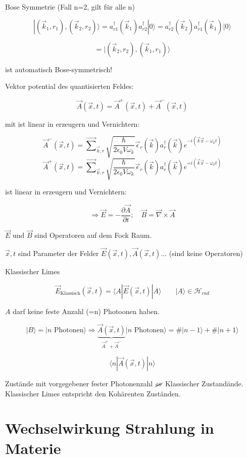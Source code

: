 Bose Symmetrie (Fall n=2, gilt für alle n)


\[|(\vec k_1,r_1),(\vec k_2,r_2)\rangle = a^\dagger_{r1}(\vec k_1) a^\dagger_{r2} |0\rangle =  a^\dagger_{r2}(\vec k_2) a^\dagger_{r1}(\vec k_1) |0\rangle   \]

\[= |(\vec k_2,r_2),(\vec k_1,r_1)\rangle    \]

ist automatisch Bose-symmetrisch!


Vektor potential des quantisierten Feldes:

\[\vec A(\vec x,t) = \vec A^+(\vec x,t) +\vec A^-(\vec x,t)  \]


mit ist linear in erzeugern und Vernichtern:

\[\vec A^-(\vec x,t) =\vec \sum_{\vec k,r} \sqrt{\frac{\hbar}{2\epsilon_0 V\omega_k}}\vec \epsilon_r(\vec k)a^\dagger_r(\vec k)e^{-i(\vec k\vec x-\omega_k t)}\]
\[\vec A^+(\vec x,t) =\vec \sum_{\vec k,r} \sqrt{\frac{\hbar}{2\epsilon_0 V\omega_k}}\vec \epsilon_r(\vec k)a^\dagger_r(\vec k)e^{+i(\vec k\vec x-\omega_k t)}\]

ist linear in erzeugern und Vernichtern:

\[\Rightarrow \vec E = -\frac{\partial \vec A}{\partial t};\quad \vec B = \vec\nabla\times\vec A\]

\(\vec E\) und \(\vec B\) sind Operatoren auf dem Fock Raum.

\(\vec x,t\) sind Parameter der Felder \(\vec E(\vec x,t),\vec A(\vec x,t)...\) (sind keine Operatoren)


Klassischer Limes

\[\vec E_{\text{Klassisch}}(\vec x,t) = \langle A|\vec E(\vec x,t)|A\rangle \qquad |A\rangle \in \mathcal H_{rad}\]

\(A\) darf keine feste Anzahl (=n) Photoonen haben. 

\[|B\rangle  = |n \text{ Photonen}\rangle  \Rightarrow \underbrace{\vec A(\vec x,t)}_{\vec A^++\vec A^-}|n \text{ Photonen}\rangle = \#|n-1\rangle +  \#|n+1\rangle  \]


\[\langle n| \vec A(\vec x,t)|n\rangle \]


Zustände mit vorgegebener fester Photonenzahl \(\cancel \Leftrightarrow \) Klassischer Zustandände. Klassischer Limes entspricht den Kohärenten Zuständen. 


\section{Wechselwirkung Strahlung in Materie}



